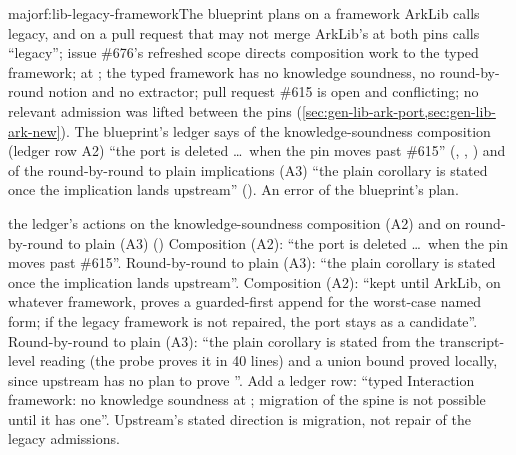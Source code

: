 \begin{finding}{major}{f:lib-legacy-framework}{The blueprint plans on a framework ArkLib calls legacy, and on a pull request that may not merge}
 ArkLib's  at both pins calls \allowbreak{}
\enquote{legacy}; issue \#676's refreshed scope directs composition work to the typed framework;
\allowbreak{}\allowbreak{} at ; the typed framework has no knowledge
soundness, no round-by-round notion and no extractor; pull request \#615 is open and conflicting;
no relevant admission was lifted between the pins (\cref{sec:gen-lib-ark-port,sec:gen-lib-ark-new}).
The blueprint's ledger says of the knowledge-soundness composition (ledger row A2) \enquote{the
port is deleted \dots\ when the pin moves past \#615} (, , )
and of the round-by-round to plain implications (A3) \enquote{the plain corollary is stated once
the implication lands upstream} ().
 An error of the blueprint's plan.
\begin{change}{the ledger's actions on the knowledge-soundness composition (A2) and on round-by-round to plain (A3) ()}
\asis Composition (A2): \enquote{the port is deleted \dots\ when the pin moves past \#615}. Round-by-round to plain (A3): \enquote{the
plain corollary is stated once the implication lands upstream}.
\asproposed Composition (A2): \enquote{kept until ArkLib, on whatever framework, proves a guarded-first append
for the worst-case named form; if the legacy framework is not repaired, the port stays as a
 candidate}. Round-by-round to plain (A3): \enquote{the plain corollary is stated from the transcript-level
reading (the probe  proves it in 40 lines) and a union bound proved locally,
since upstream has no plan to prove \allowbreak{}\allowbreak{}}. Add
a ledger row: \enquote{typed Interaction framework: no knowledge soundness at ;
migration of the spine is not possible until it has one}.
\reason Upstream's stated direction is migration, not repair of the legacy admissions.
\end{change}
\end{finding}

